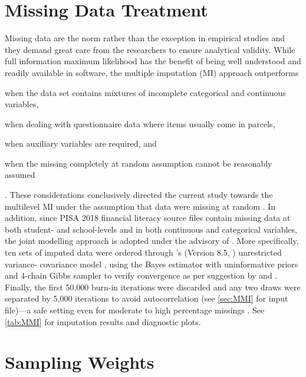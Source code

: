 \documentclass[a4paper,11pt,UKenglish,twoside,openright]{report}\usepackage[]{graphicx}\usepackage[]{color}
\begin{document}


\section{Missing Data Treatment}

Missing data are the norm rather than the exception in empirical studies and they demand great care from the researchers to ensure analytical validity. While full information maximum likelihood has the benefit of being well understood and readily available in software, the multiple imputation (MI) approach outperforms
\begin{enumerate*}[label={(\alph*)}]
    \item when the data set contains mixtures of incomplete categorical and continuous variables,
    \item when dealing with questionnaire data where items usually come in parcels,
    \item when auxiliary variables are required, and
    \item when the missing completely at random assumption cannot be reasonably assumed
\end{enumerate*}
\parencite{enders:2018}. These considerations conclusively directed the current study towards the multilevel MI under the assumption that data were missing at random \parencite{little:2019}. In addition, since PISA 2018 financial literacy source files contain missing data at both student- and school-levels and in both continuous and categorical variables, the joint modelling approach is adopted under the advisory of \textcite{grund:2018}. More specifically, ten sets of imputed data were ordered through \CM's (Version 8.5, \textcite{mplus}) unrestricted variance- covariance model \parencite[``JM-AM H1'',][]{asparouhov:2010b}, using the Bayes estimator with uninformative priors and 4-chain Gibbs sampler to verify convergence as per suggestion by \textcite[][p. 230]{little:2019} and \textcite[][p. 314]{lambert:2018}. Finally, the first 50,000 burn-in iterations were discarded and any two draws were separated by 5,000 iterations to avoid autocorrelation (see \cref{sec:MMI} for input file)---a safe setting even for moderate to high percentage missings \parencite{grund:2016}. See \cref{tab:MMI} for imputation results and diagnostic plots.

\section{Sampling Weights}
\end{document}
